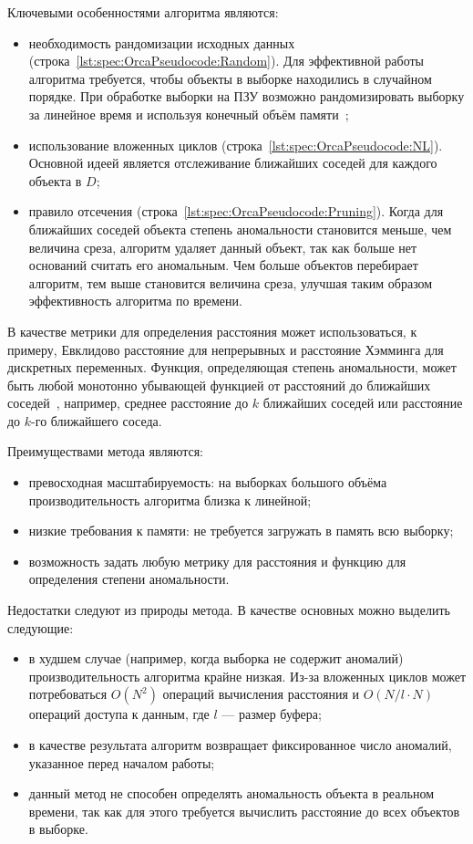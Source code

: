 Ключевыми особенностями алгоритма являются:
\begin{itemize}
	\item необходимость рандомизации исходных данных (строка~\ref{lst:spec:OrcaPseudocode:Random}). Для эффективной работы алгоритма требуется, чтобы объекты в выборке находились в случайном порядке. При обработке выборки на ПЗУ возможно рандомизировать выборку за линейное время и используя конечный объём памяти~\cite{BaySchwabacherOrca};
	\item использование вложенных циклов (строка~\ref{lst:spec:OrcaPseudocode:NL}). Основной идеей является отслеживание ближайших соседей для каждого объекта в $D$;
	\item правило отсечения (строка~\ref{lst:spec:OrcaPseudocode:Pruning}). Когда для ближайших соседей объекта степень аномальности становится меньше, чем величина среза, алгоритм удаляет данный объект, так как больше нет оснований считать его аномальным. Чем больше объектов перебирает алгоритм, тем выше становится величина среза, улучшая таким образом эффективность алгоритма по времени.
\end{itemize}

В качестве метрики для определения расстояния может использоваться, к примеру, Евклидово расстояние для непрерывных и расстояние Хэмминга для дискретных переменных. Функция, определяющая степень аномальности, может быть любой монотонно убывающей функцией от расстояний до ближайших соседей~\cite{BaySchwabacherOrca}, например, среднее расстояние до $k$ ближайших соседей или расстояние до $k$-го ближайшего соседа.

Преимуществами метода являются:
\begin{itemize}
	\item превосходная масштабируемость: на выборках большого объёма производительность алгоритма близка к линейной;
	\item низкие требования к памяти: не требуется загружать в память всю выборку;
	\item возможность задать любую метрику для расстояния и функцию для определения степени аномальности.
\end{itemize}

Недостатки следуют из природы метода. В качестве основных можно выделить следующие:
\begin{itemize}
	\item в худшем случае (например, когда выборка не содержит аномалий) производительность алгоритма крайне низкая. Из-за вложенных циклов может потребоваться $O(N^2)$ операций вычисления расстояния и $O(N/l \cdot N)$ операций доступа к данным, где $l$ --- размер буфера;
	\item в качестве результата алгоритм возвращает фиксированное число аномалий, указанное перед началом работы;
	\item данный метод не способен определять аномальность объекта в реальном времени, так как для этого требуется вычислить расстояние до всех объектов в выборке.
\end{itemize}